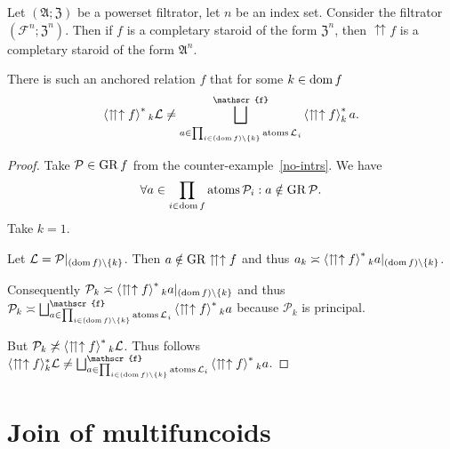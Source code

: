 \begin{conjecture}
Let $(\mathfrak{A};\mathfrak{Z})$ be a powerset filtrator, let $n$
be an index set. Consider the filtrator $(\mathscr{F}^{n};\mathfrak{Z}^{n})$.
Then if $f$ is a completary staroid of the form $\mathfrak{Z}^{n}$,
then $\upuparrows f$ is a completary staroid of the form $\mathfrak{A}^{n}$.
\end{conjecture}

\begin{example}
There is such an anchored relation $f$ that for some $k\in\operatorname{dom} f$
\[
\rsupfun{\upuparrows\uparrow f}{}_{k}\mathcal{L}\neq\bigsqcup_{a\in\prod_{i\in(\dom f)\setminus\{k\}}\atoms\mathcal{L_{}}_{i}}^{\mathscr{f}}\rsupfun{\upuparrows\uparrow f}_{k}a.
\]
\end{example}
\begin{proof}
Take $\mathcal{P}\in\operatorname{GR} f$ from the counter-example~\ref{no-intrs}. We
have 
\[
\forall a\in\prod_{i\in\operatorname{dom} f}\operatorname{atoms}\mathcal{P}_{i}:a\notin\operatorname{GR}\mathcal{P}.
\]
Take $k=1$.

Let $\mathcal{L}=\mathcal{P}|_{(\operatorname{dom} f)\setminus\{k\}}$. Then $a\notin\operatorname{GR}\upuparrows\uparrow f$
and thus $a_{k}\asymp\left\langle \upuparrows\uparrow f\right\rangle ^{\ast}{}_{k}a|_{(\operatorname{dom} f)\setminus\{k\}}$.

Consequently $\mathcal{P}_{k}\asymp\left\langle \upuparrows\uparrow f\right\rangle ^{\ast}{}_{k}a|_{(\operatorname{dom} f)\setminus\{k\}}$
and thus $\mathcal{P}_{k}\asymp\bigsqcup_{a\in\prod_{i\in(\dom f)\setminus\{k\}}\atoms\mathcal{L_{}}_{i}}^{\mathscr{f}}\rsupfun{\upuparrows\uparrow f}{}_{k}a$
because $\mathcal{P}_{k}$ is principal.

But $\mathcal{P}_{k}\not\asymp\left\langle \upuparrows\uparrow f\right\rangle ^{\ast}{}_{k}\mathcal{L}$.
Thus follows $\langle\upuparrows\uparrow f\rangle_{k}^{\ast}\mathcal{L}\neq\bigsqcup_{a\in\prod_{i\in(\dom f)\setminus\{k\}}\atoms\mathcal{L}_{i}}^{\mathscr{f}}\rsupfun{\upuparrows\uparrow f}{}_{k}a$.\end{proof}
\section{Join of multifuncoids}


